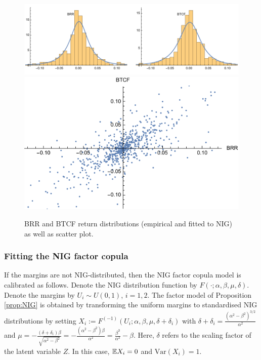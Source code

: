 \begin{figure}[t]
  \centering
  \includegraphics[scale=.7]{_pics/fittedNIG.pdf} 
  \includegraphics[scale=.7]{_pics/scatter.pdf}
  \caption{BRR and BTCF return distributions (empirical and fitted to
    NIG) as well as scatter plot.}
  \label{fig:nig}
\end{figure}

\subsubsection{Fitting the NIG factor copula}
\label{sec:fitting-nig-factor}

If the margins are not NIG-distributed, then the NIG factor copula
model is calibrated as follows. Denote the NIG distribution function
by $F(\cdot; \alpha, \beta, \mu, \delta)$. Denote the margins by
$U_i\sim U(0,1)$, $i=1,2$. The factor model of Proposition
\ref{prop:NIG} is 
obtained by transforming the uniform margins to standardised NIG
distributions by setting  
$X_i:=F^{(-1)}(U_i; \alpha, \beta, \mu, \delta+\delta_i)$ with 
$\delta+\delta_i=\displaystyle \frac{(\alpha^2-\beta^2)^{3/2}}
{\alpha^2}$ and $\mu=\displaystyle -\frac{(\delta+\delta_i)\beta}
{\sqrt{\alpha^2-\beta^2}} = -\frac{(\alpha^2-\beta^2) \beta}
{\alpha^2}=\frac{\beta^3}{\alpha^2}-\beta$. Here, $\delta$ refers to
the scaling factor of the latent variable $Z$. In 
this case, ${\mathbb{E}} X_i=0$ and $\text{Var}(X_i)=1$.


